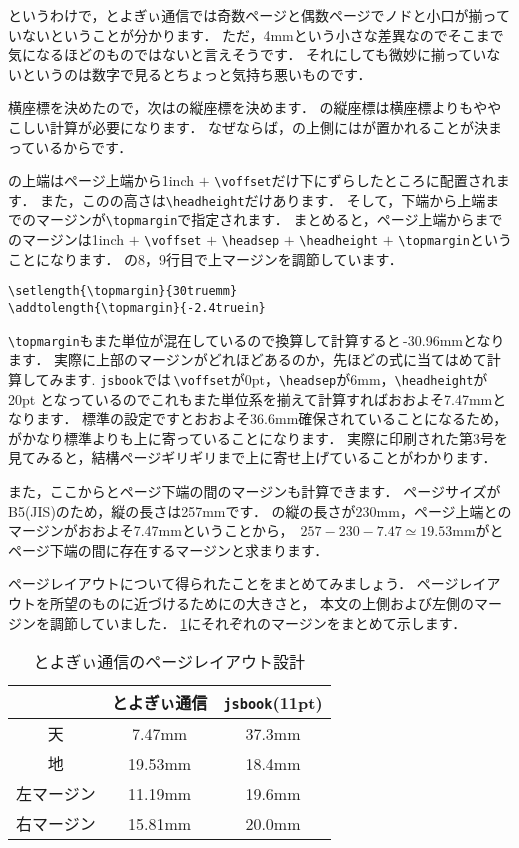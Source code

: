 というわけで，とよぎぃ通信では奇数ページと偶数ページでノドと小口が揃っていないということが分かります．
ただ，4mmという小さな差異なのでそこまで気になるほどのものではないと言えそうです．
それにしても微妙に揃っていないというのは数字で見るとちょっと気持ち悪いものです．

横座標を決めたので，次はの縦座標を決めます．
の縦座標は横座標よりもややこしい計算が必要になります．
なぜならば，の上側にはが置かれることが決まっているからです．

の上端はページ上端から1inch $+$ \verb|\voffset|だけ下にずらしたところに配置されます．
また，このの高さは\verb|\headheight|だけあります．
そして，下端から上端までのマージンが\verb|\topmargin|で指定されます．
まとめると，ページ上端からまでのマージンは1inch $+$ \verb|\voffset| $+$ \verb|\headsep| $+$ \verb|\headheight| $+$ \verb|\topmargin|ということになります．
の8，9行目で上マージンを調節しています．
\begin{verbatim}
\setlength{\topmargin}{30truemm}
\addtolength{\topmargin}{-2.4truein}
\end{verbatim}
\verb|\topmargin|もまた単位が混在しているので換算して計算すると\,-30.96mmとなります．
実際に上部のマージンがどれほどあるのか，先ほどの式に当てはめて計算してみます. 
\verb|jsbook|では\,\verb|\voffset|が0pt，\verb|\headsep|が6mm，\verb|\headheight|が20pt
となっているのでこれもまた単位系を揃えて計算すればおおよそ7.47mmとなります．
標準の設定ですとおおよそ36.6mm確保されていることになるため，
がかなり標準よりも上に寄っていることになります．
実際に印刷された第3号を見てみると，結構ページギリギリまで上に寄せ上げていることがわかります．

また，ここからとページ下端の間のマージンも計算できます．
ページサイズがB5(JIS)のため，縦の長さは257mmです．
の縦の長さが230mm，ページ上端とのマージンがおおよそ7.47mmということから，
\,$257 - 230 - 7.47 \simeq 19.53\mathrm{mm}$がとページ下端の間に存在するマージンと求まります．

ページレイアウトについて得られたことをまとめてみましょう．
ページレイアウトを所望のものに近づけるためにの大きさと，
本文の上側および左側のマージンを調節していました．
\tablename\ref{tbl:toyogylayout}にそれぞれのマージンをまとめて示します．

\begin{table}[!ht]
	\centering
	\caption{とよぎぃ通信のページレイアウト設計}
	\label{tbl:toyogylayout}
	\begin{tabular}{c|c|c} \hline \hline
		& とよぎぃ通信 & \verb|jsbook|(11pt) \\ \hline
		天 & 7.47mm & 37.3mm \\
		地 & 19.53mm & 18.4mm \\
		左マージン & 11.19mm & 19.6mm \\
		右マージン & 15.81mm & 20.0mm \\ \hline
	\end{tabular}
\end{table}

